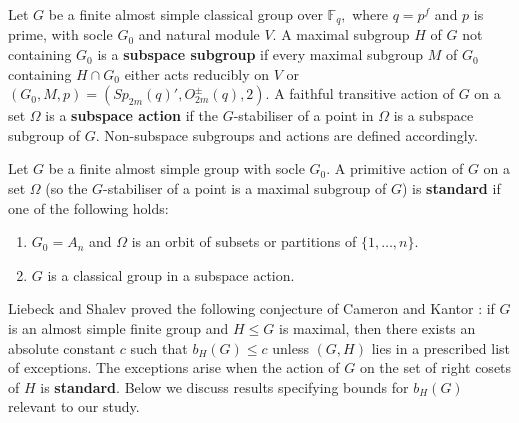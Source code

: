 \begin{Def}
\label{nonstdef}
Let $G$ be a finite almost simple classical group over $\mathbb{F}_q,$ where $q=p^f$ and  $p$ is prime, with socle $G_0$ and natural module $V$. A maximal subgroup $H$ of $G$ not containing $G_0$ is a {\bf subspace subgroup}  if every
maximal subgroup $M$ of $G_0$ containing $H \cap G_0$ either acts reducibly on $V$ or $(G_0,M, p) = (Sp_{2m}(q)',O^{\pm}_{2m}(q), 2)$.   
A faithful transitive action of $G$ on a set $\Omega$ is a {\bf subspace action}  if the $G$-stabiliser of a point in
$\Omega$ is a subspace subgroup of $G$.  Non-subspace subgroups and actions are defined accordingly.
\end{Def}


\begin{Def}
Let $G$ be a finite almost simple group with socle $G_0$. A primitive  
action of $G$ on a set $\Omega$ (so the $G$-stabiliser of a point is a maximal subgroup of $G$) is {\bf standard}  if one of the following holds:
\begin{enumerate}
\item $G_0 = A_n$ and $\Omega$ is an orbit of subsets or partitions of $\{1, \ldots,n\}$.
\item $G$ is a classical group in a subspace action.
\end{enumerate}
\end{Def}

  Liebeck and Shalev \cite{lieb} proved the following conjecture of Cameron and Kantor \cite{Camer}:  if $G$ is an almost simple finite group and $H\le G$ is maximal, then there exists an absolute constant $c$ such that $b_H(G)\le  c$ unless $(G,H)$ lies in a prescribed list of exceptions. The exceptions arise when the action of $G$ on the set of right cosets of $H$  is {\bf standard}. Below we discuss  results specifying bounds for $b_H(G)$ relevant to our study.  



\bigskip

